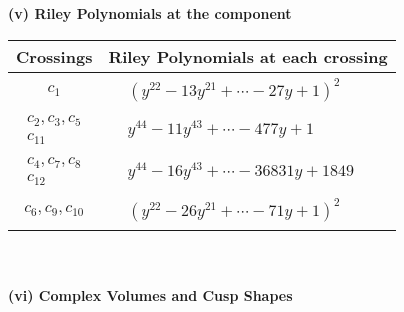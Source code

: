 \documentclass[1p]{elsarticle_modified}
\theoremstyle{definition}
\begin{document}
\newpage\renewcommand{\arraystretch}{1}
\flushleft \textbf{(v) Riley Polynomials at the component}\newline \\
\begin{tabular}{m{50pt}|m{274pt}}
Crossings & \hspace{64pt}Riley Polynomials at each crossing \\
\hline $$\begin{aligned}c_{1}\end{aligned}$$&$\begin{aligned}
&(y^{22}-13 y^{21}+\cdots-27 y+1)^{2}
\end{aligned}$\\
\hline $$\begin{aligned}c_{2},c_{3},c_{5}\\c_{11}\end{aligned}$$&$\begin{aligned}
&y^{44}-11 y^{43}+\cdots-477 y+1
\end{aligned}$\\
\hline $$\begin{aligned}c_{4},c_{7},c_{8}\\c_{12}\end{aligned}$$&$\begin{aligned}
&y^{44}-16 y^{43}+\cdots-36831 y+1849
\end{aligned}$\\
\hline $$\begin{aligned}c_{6},c_{9},c_{10}\end{aligned}$$&$\begin{aligned}
&(y^{22}-26 y^{21}+\cdots-71 y+1)^{2}
\end{aligned}$\\
\hline
\end{tabular}\\~\\
\newpage\flushleft \textbf{(vi) Complex Volumes and Cusp Shapes}
\end{document}

